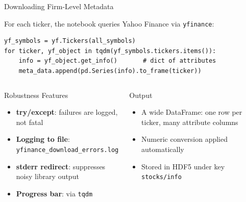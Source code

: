 \documentclass[aspectratio=169]{beamer}
\begin{document}
\begin{frame}[fragile]{Downloading Firm-Level Metadata}

For each ticker, the notebook queries Yahoo Finance via \texttt{yfinance}:
\vspace{-.3cm}
\begin{tcolorbox}[
  colback=gray!5,
  colframe=gray!60,
  arc=4mm
]
\begin{lstlisting}
yf_symbols = yf.Tickers(all_symbols)
for ticker, yf_object in tqdm(yf_symbols.tickers.items()):
    info = yf_object.get_info()       # dict of attributes
    meta_data.append(pd.Series(info).to_frame(ticker))
\end{lstlisting}
\end{tcolorbox}
\vspace{-.5cm}
\begin{columns}[T]
\begin{block}{Robustness Features}
\small
\begin{itemize}
  \item \textbf{try/except}: failures are logged, not fatal
  \item \textbf{Logging to file}: \texttt{yfinance\_download\_errors.log}
  \item \textbf{stderr redirect}: suppresses noisy library output
  \item \textbf{Progress bar}: via \texttt{tqdm}
\end{itemize}
\end{block}

\begin{block}{Output}
\begin{itemize}
  \item A wide DataFrame: one row per ticker, many attribute columns
  \item Numeric conversion applied automatically
  \item Stored in HDF5 under key \texttt{stocks/info}
\end{itemize}
\end{block}
\end{columns}

\end{frame}
%
%
\end{document}
